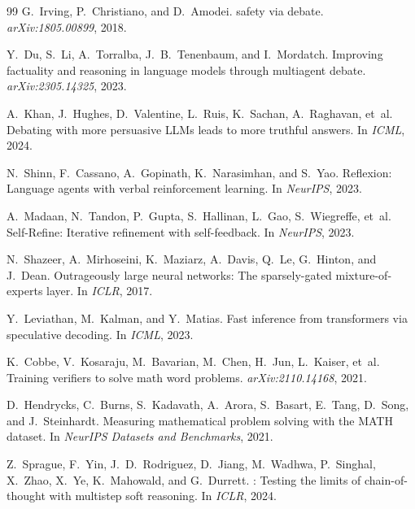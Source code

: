 \documentclass[11pt]{amsart}
\newcommand\1{{\mathds{1}}}
\theoremstyle{definition}
\theoremstyle{remark}
\numberwithin{equation}{section}
\begin{document}
\begin{thebibliography}{99}
G.~Irving, P.~Christiano, and D.~Amodei.
 safety via debate.
\newblock \emph{arXiv:1805.00899}, 2018.

Y.~Du, S.~Li, A.~Torralba, J.~B.~Tenenbaum, and I.~Mordatch.
\newblock Improving factuality and reasoning in language models through multiagent debate.
\newblock \emph{arXiv:2305.14325}, 2023.

A.~Khan, J.~Hughes, D.~Valentine, L.~Ruis, K.~Sachan, A.~Raghavan, et~al.
\newblock Debating with more persuasive {LLMs} leads to more truthful answers.
\newblock In \emph{ICML}, 2024.

N.~Shinn, F.~Cassano, A.~Gopinath, K.~Narasimhan, and S.~Yao.
\newblock Reflexion: Language agents with verbal reinforcement learning.
\newblock In \emph{NeurIPS}, 2023.

A.~Madaan, N.~Tandon, P.~Gupta, S.~Hallinan, L.~Gao, S.~Wiegreffe, et~al.
\newblock Self-{R}efine: Iterative refinement with self-feedback.
\newblock In \emph{NeurIPS}, 2023.

N.~Shazeer, A.~Mirhoseini, K.~Maziarz, A.~Davis, Q.~Le, G.~Hinton, and J.~Dean.
\newblock Outrageously large neural networks: The sparsely-gated mixture-of-experts layer.
\newblock In \emph{ICLR}, 2017.

Y.~Leviathan, M.~Kalman, and Y.~Matias.
\newblock Fast inference from transformers via speculative decoding.
\newblock In \emph{ICML}, 2023.

K.~Cobbe, V.~Kosaraju, M.~Bavarian, M.~Chen, H.~Jun, L.~Kaiser, et~al.
\newblock Training verifiers to solve math word problems.
\newblock \emph{arXiv:2110.14168}, 2021.

D.~Hendrycks, C.~Burns, S.~Kadavath, A.~Arora, S.~Basart, E.~Tang, D.~Song, and J.~Steinhardt.
\newblock Measuring mathematical problem solving with the {MATH} dataset.
\newblock In \emph{NeurIPS Datasets and Benchmarks}, 2021.


Z.~Sprague, F.~Yin, J.~D.~Rodriguez, D.~Jiang, M.~Wadhwa, P.~Singhal, X.~Zhao, X.~Ye, K.~Mahowald, and G.~Durrett.
: Testing the limits of chain-of-thought with multistep soft reasoning.
\newblock In \emph{ICLR}, 2024.


\end{thebibliography}
\end{document}

